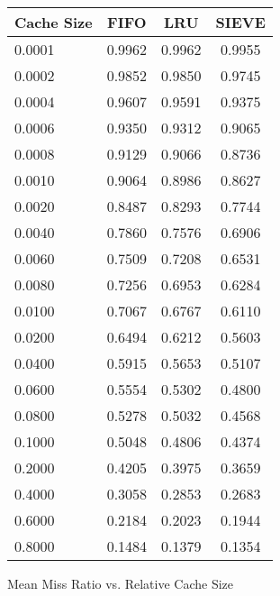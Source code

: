 \begin{figure}[h!]
    \centering
    \caption{Mean Miss Ratio vs. Relative Cache Size}
    \label{tab:miss_ratio_data}
    \begin{tabular}{l c c c}
        \toprule
        \textbf{Cache Size} & \textbf{FIFO} & \textbf{LRU} & \textbf{SIEVE} \\
        \midrule
        0.0001 & 0.9962 & 0.9962 & 0.9955 \\
        0.0002 & 0.9852 & 0.9850 & 0.9745 \\
        0.0004 & 0.9607 & 0.9591 & 0.9375 \\
        0.0006 & 0.9350 & 0.9312 & 0.9065 \\
        0.0008 & 0.9129 & 0.9066 & 0.8736 \\
        0.0010 & 0.9064 & 0.8986 & 0.8627 \\
        0.0020 & 0.8487 & 0.8293 & 0.7744 \\
        0.0040 & 0.7860 & 0.7576 & 0.6906 \\
        0.0060 & 0.7509 & 0.7208 & 0.6531 \\
        0.0080 & 0.7256 & 0.6953 & 0.6284 \\
        0.0100 & 0.7067 & 0.6767 & 0.6110 \\
        0.0200 & 0.6494 & 0.6212 & 0.5603 \\
        0.0400 & 0.5915 & 0.5653 & 0.5107 \\
        0.0600 & 0.5554 & 0.5302 & 0.4800 \\
        0.0800 & 0.5278 & 0.5032 & 0.4568 \\
        0.1000 & 0.5048 & 0.4806 & 0.4374 \\
        0.2000 & 0.4205 & 0.3975 & 0.3659 \\
        0.4000 & 0.3058 & 0.2853 & 0.2683 \\
        0.6000 & 0.2184 & 0.2023 & 0.1944 \\
        0.8000 & 0.1484 & 0.1379 & 0.1354 \\
        \bottomrule
    \end{tabular}
\end{figure}

